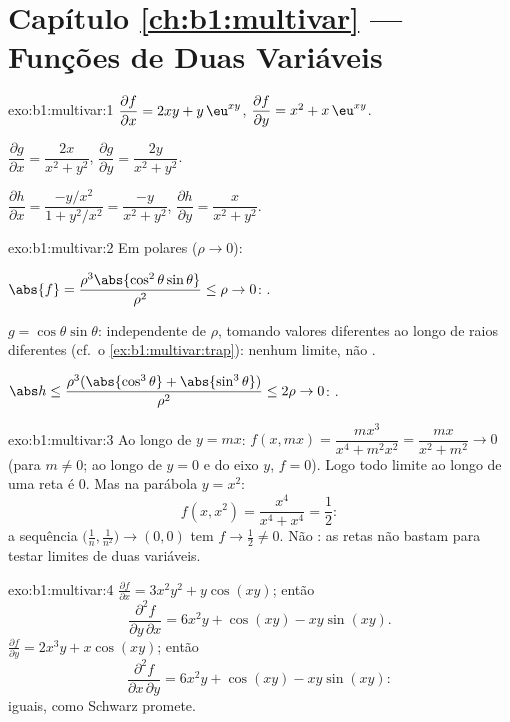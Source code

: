 \section*{Capítulo \ref{ch:b1:multivar} --- Funções de Duas Variáveis}

\begin{solution}{exo:b1:multivar:1}
$\dfrac{\partial f}{\partial x} = 2xy + y\,\eu^{xy}$,
$\dfrac{\partial f}{\partial y} = x^2 + x\,\eu^{xy}$.

$\dfrac{\partial g}{\partial x} = \dfrac{2x}{x^2+y^2}$,
$\dfrac{\partial g}{\partial y} = \dfrac{2y}{x^2+y^2}$.

$\dfrac{\partial h}{\partial x} = \dfrac{-y/x^2}{1 + y^2/x^2} =
\dfrac{-y}{x^2+y^2}$,
$\dfrac{\partial h}{\partial y} = \dfrac{x}{x^2+y^2}$.
\end{solution}

\begin{solution}{exo:b1:multivar:2}
Em  polares ($\rho \to 0$):

$\abs{f} = \dfrac{\rho^3\abs{\cos^2\theta\sin\theta}}{\rho^2} \leq
\rho \to 0$: .

$g = \cos\theta\sin\theta$: independente de $\rho$, tomando valores diferentes ao longo de
raios diferentes (cf.\ o \cref{ex:b1:multivar:trap}): nenhum limite, não .

$\abs h \leq \dfrac{\rho^3(\abs{\cos^3\theta} +
\abs{\sin^3\theta})}{\rho^2} \leq 2\rho \to 0$: .
\end{solution}

\begin{solution}{exo:b1:multivar:3}
Ao longo de $y = mx$: $f(x, mx) = \dfrac{m x^3}{x^4 + m^2 x^2} =
\dfrac{mx}{x^2 + m^2} \to 0$ (para $m \neq 0$; ao longo de $y = 0$ e do
eixo $y$, $f = 0$). Logo todo limite ao longo de uma reta é $0$. Mas
na parábola $y = x^2$:
\[
f(x, x^2) = \frac{x^4}{x^4 + x^4} = \frac12 :
\]
a sequência $\bigl(\frac1n, \frac{1}{n^2}\bigr) \to (0,0)$ tem $f \to \frac12 \neq 0$. Não : as retas não bastam para
testar limites de duas variáveis.
\end{solution}

\begin{solution}{exo:b1:multivar:4}
$\frac{\partial f}{\partial x} = 3x^2y^2 + y\cos(xy)$; então
\[
\frac{\partial^2 f}{\partial y\,\partial x}
= 6x^2 y + \cos(xy) - xy\sin(xy) .
\]
$\frac{\partial f}{\partial y} = 2x^3 y + x\cos(xy)$; então
\[
\frac{\partial^2 f}{\partial x\,\partial y}
= 6x^2 y + \cos(xy) - xy\sin(xy) :
\]
iguais, como Schwarz promete.
\end{solution}

